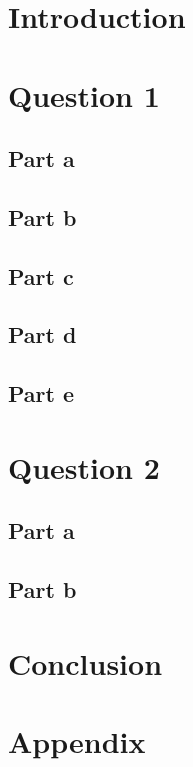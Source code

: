 \documentclass[a4paper 12pt]{article}
\begin{document}
\hypersetup{pageanchor=false}

\hypersetup{pageanchor=true}

\tableofcontents
\clearpage
\section{Introduction}

\section{Question 1}

\subsection{Part a}

\subsection{Part b}

\subsection{Part c}

\subsection{Part d}

\subsection{Part e}

\section{Question 2}

\subsection{Part a}

\subsection{Part b}

\section{Conclusion}

\clearpage
\section{Appendix}

\printbibliography
\end{document}
